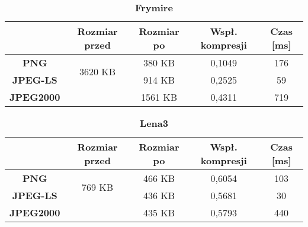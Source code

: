 \begin{table}[!h]
	\centering
	\caption{\textbf{Frymire}}
	\label{my-label}
	\begin{tabular}{|c|c|c|c|c|}                                             
		\hline
		& \textbf{Rozmiar przed} & \textbf{Rozmiar po} & \textbf{Wspł. kompresji} & \textbf{Czas {[}ms{]}} \\ \hline 
		\textbf{PNG}      &          \multicolumn{1}{c|}{\multirow{2}{*}{3620 KB}}             &         380 KB              &        0,1049                    &            176                 \\\cline{3-5}
		\textbf{JPEG-LS}  &                        &        914 KB             &         0,2525                 &           59               \\\cline{3-5}
		\textbf{JPEG2000} &                        &         1561 KB               &          0,4311                &       719               \\ \hline
	\end{tabular}
\end{table}

\begin{table}[!h]
	\centering
	\caption{\textbf{Lena3}}
	\label{my-label}
	\begin{tabular}{|c|c|c|c|c|}                                             
		\hline
		& \textbf{Rozmiar przed} & \textbf{Rozmiar po} & \textbf{Wspł. kompresji} & \textbf{Czas {[}ms{]}} \\ \hline 
		\textbf{PNG}      &          \multicolumn{1}{c|}{\multirow{2}{*}{769 KB}}             &      466 KB               &        0,6054                  &         103                    \\\cline{3-5}
		\textbf{JPEG-LS}  &                        &         436 KB            &      0,5681                    &         30                 \\\cline{3-5}
		\textbf{JPEG2000} &                        &     435 KB             &         0,5793                 &       440               \\ \hline
	\end{tabular}
\end{table}

